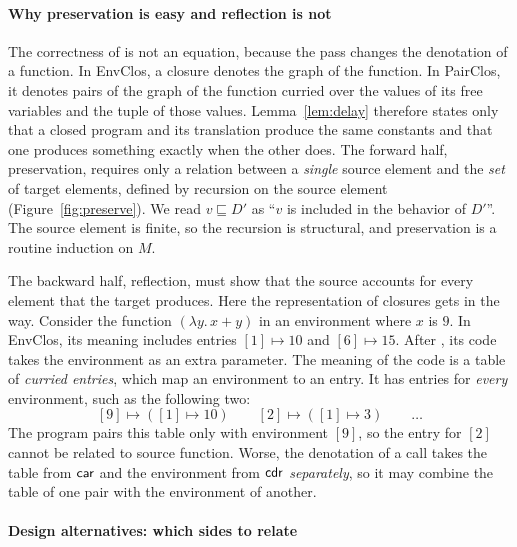 \paragraph{Why preservation is easy and reflection is not}

The correctness of  is not an equation, because
the pass changes the denotation of a function. In EnvClos, a closure
denotes the graph of the function. In PairClos, it denotes pairs of
the graph of the function curried over the values of its free
variables and the tuple of those values. Lemma~\ref{lem:delay}
therefore states only that a closed program and its translation
produce the same constants and that one produces something exactly
when the other does. The forward half, preservation, requires only a
relation between a \emph{single} source element and the \emph{set} of
target elements, defined by recursion on the source element
(Figure~\ref{fig:preserve}). We read $v \sqsubseteq D'$ as ``$v$ is
included in the behavior of $D'$''. The source element is finite, so
the recursion is structural, and preservation is a routine induction
on $M$.

The backward half, reflection, must show that the source accounts for
every element that the target produces. Here the representation of
closures gets in the way. Consider the function $(\lambda y.\, x + y)$
in an environment where $x$ is $9$. In EnvClos, its meaning 
includes entries $[1] \mapsto 10$ and $[6] \mapsto 15$. After
, its code takes the environment as an extra
parameter. The meaning of the code is a table of \emph{curried
entries}, which map an environment to an entry. It has entries for
\emph{every} environment, such as the following two:
\[
  [9] \mapsto ([1] \mapsto 10) \qquad
  [2] \mapsto ([1] \mapsto 3)  \qquad \ldots
\]
The program pairs this table only with environment $[9]$, so the entry
for $[2]$ cannot be related to source function. Worse, the
denotation of a call takes the table from $\mathsf{car}$ and the environment
from $\mathsf{cdr}$ \emph{separately}, so it may combine the table of one pair
with the environment of another.

\paragraph{Design alternatives: which sides to relate}

